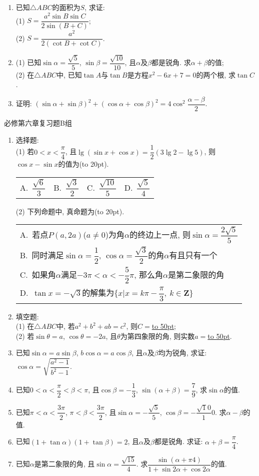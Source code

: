 \documentclass[10pt,a4paper]{article}
\newcommand{\blank}[1]{\underline{\hbox to #1pt{}}}
\newcommand{\bracket}[1]{(\hbox to #1pt{})}
\newcommand{\onech}[4]{\par\begin{tabular}{p{.9\textwidth}}
A.~#1\\
B.~#2\\
C.~#3\\
D.~#4
\end{tabular}}
\newcommand{\fourch}[4]{\par\begin{tabular}{p{.23\textwidth}p{.23\textwidth}p{.23\textwidth}p{.23\textwidth}}
A.~#1 &B.~#2& C.~#3& D.~#4
\end{tabular}}
\begin{document}
\begin{enumerate}[1.]
\item 已知$\triangle ABC$的面积为$S$, 求证:\\
(1) $S=\dfrac{a^2\sin B\sin C}{2\sin (B+C)}$;\\
(2) $S=\dfrac{a^2}{2(\cot B+\cot C)}$.
\item (1) 已知$\sin \alpha=\dfrac{\sqrt 5}5$, $\sin \beta=\dfrac{\sqrt {10}}{10}$, 且$\alpha$及$\beta$都是锐角. 求$\alpha+\beta$的值;\\
(2) 在$\triangle ABC$中, 已知$\tan A$与$\tan B$是方程$x^2-6x+7=0$的两个根, 求$\tan C$.
\item 证明: $(\sin \alpha+\sin \beta)^2+(\cos \alpha+\cos \beta)^2=4\cos^2\dfrac{\alpha-\beta}{2}$. 
\end{enumerate}

必修第六章复习题B组
\begin{enumerate}[1.]
\item 选择题:\\
(1) 若$0<x<\dfrac\pi 4$, 且$\lg (\sin x+\cos x)=\dfrac12(3\lg 2-\lg 5)$, 则$\cos x-\sin x$的值为\bracket{20}.
\fourch{$\dfrac{\sqrt{6}}3$}{$\dfrac{\sqrt{3}}2$}{$\dfrac{\sqrt{10}}5$}{$\dfrac{\sqrt{5}}4$}
(2) 下列命题中, 真命题为\bracket{20}.
\onech{若点$P(a, 2a)$($a\ne 0$)为角$\alpha$的终边上一点, 则$\sin \alpha=\dfrac{2\sqrt 5}5$}
{同时满足$\sin \alpha=\dfrac 12$, $\cos \alpha=\dfrac{\sqrt3}2$的角$\alpha$有且只有一个}
{如果角$\alpha$满足$-3\pi <\alpha<-\dfrac 52\pi$, 那么角$\alpha$是第二象限的角}
{$\tan x=-\sqrt 3$的解集为$\{x|x=k\pi -\dfrac\pi 3, \  k\in \mathbf{Z}\}$}
\item 填空题:\\
(1) 在$\triangle ABC$中, 若$a^2+b^2+ab=c^2$, 则$C=$\blank{50};\\
(2) 若$\sin \theta =a$, $\cos \theta =-2a$, 且$\theta$为第四象限的角, 则实数$a=$\blank{50}.\\
\item 已知$\sin \alpha=a\sin \beta$, $b\cos \alpha=a\cos \beta$, 且$\alpha$及$\beta$均为锐角, 求证: $\cos \alpha= \sqrt{\dfrac{a^2-1}{b^2-1}}$.
\item 已知$0<\alpha<\dfrac\pi 2<\beta<\pi$, 且$\cos \beta=-\dfrac13$, $\sin (\alpha+\beta)=\dfrac79$, 求$\sin \alpha$的值.
\item 已知$\pi <\alpha<\dfrac{3\pi} 2$, $\pi <\beta<\dfrac{3\pi} 2$, 且$\sin \alpha=-\dfrac{\sqrt 5}5$, $\cos \beta=-\dfrac{\sqrt 10}10$. 求$\alpha-\beta$的值.
\item 已知$(1+\tan \alpha)(1+\tan \beta)=2$, 且$\alpha$及$\beta$都是锐角. 求证: $\alpha+\beta=\dfrac\pi 4$.
\item 已知$\alpha$是第二象限的角, 且$\sin \alpha=\dfrac{\sqrt {15}}4$. 求$\dfrac{\sin (\alpha+\pi 4)}{1+\sin 2\alpha+\cos 2\alpha}$的值.

\end{enumerate}
\end{document}

